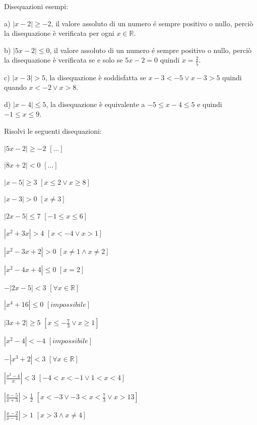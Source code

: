 \begin{esercizio}\label{ese:03.1}
Disequazioni esempi:
\begin{enumeratea}
        \item[a)] $|x-2|\geq -2$, il valore assoluto di un numero é sempre 
positivo o nullo, perciò la disequazione è verificata per ogni $x\in 
\mathbb{R}$.

        \item[b)] $|5x-2|\leq 0$, il valore assoluto di un numero é sempre 
positivo o nullo, perciò la disequazione è verificata se e solo se $5x-2=0$ 
quindi $x=\frac{2}{5}$.
        \item[c)] $|x-3|>5$, la disequazione è soddisfatta se $x-3<-5 \vee 
x-3>5$ quindi quando $x<-2 \vee x>8$.
        \item[d)] $|x-4|\leq 5$, la disequazione è equivalente a $-5\leq x-4 
\leq 5$ e quindi $-1\leq x \leq 9$.
\end{enumeratea}

\noindent Risolvi le seguenti disequazioni:

\begin{multicols}{2}
\begin{enumeratea}
\item $\left| 5x-2\right| \geq -2 $ \hfill $\left[ \dots \right] $
\item $\left| 8x+2\right| < 0 $ \hfill $\left[ \dots \right] $
\item $\left| x-5\right| \geq 3 $ \hfill $\left[ x\leq 2 \vee x\geq 8 \right] $
\item $\left| x-3\right| >0 $ \hfill $\left[ x\neq 3 \right] $
\item $\left| 2x-5\right| \leq 7 $ \hfill $\left[ -1\leq x \leq 6 \right] $
\item $\left| x^2+3x\right| >4 $ \hfill $\left[ x<-4 \vee x>1 \right] $
\item $\left| x^2-3x+2\right| >0 $ \hfill $\left[ x\neq 1 \wedge x\neq 2 \right] 
$
\item $\left| x^2-4x+4\right| \leq 0 $ \hfill $\left[ x=2 \right] $
\item $-\left| 2x-5\right| <3 $ \hfill $\left[ \forall x \in \mathbb{R} \right] 
$
\item $\left| x^4+16\right| \leq 0 $ \hfill $\left[ impossibile \right] $
\item $\left| 3x+2\right| \geq 5 $ \hfill $\left[ x\leq -\frac{7}{3} \vee x\geq 
1 \right] $
\item $\left| x^2-4\right| <-4 $ \hfill $\left[ impossibile \right] $
\item $-\left| x^3+2\right| <3 $ \hfill $\left[ \forall x \in \mathbb{R} \right] 
$
\item $\left| \frac{x^2-4}{x}\right| <3 $ \hfill $\left[ -4<x<-1 \vee 1<x<4 
\right] $
\item $\left| \frac{x-5}{x+3}\right| >\frac{1}{2} $ \hfill $\left[x<-3 \vee 
-3<x<\frac{7}{3} \vee x>13 \right] $
\item $\left| \frac{x-2}{x-4}\right| >1 $ \hfill $\left[x>3 \wedge x \neq 4 
\right] $
\end{enumeratea}
\end{multicols}
\end{esercizio}


